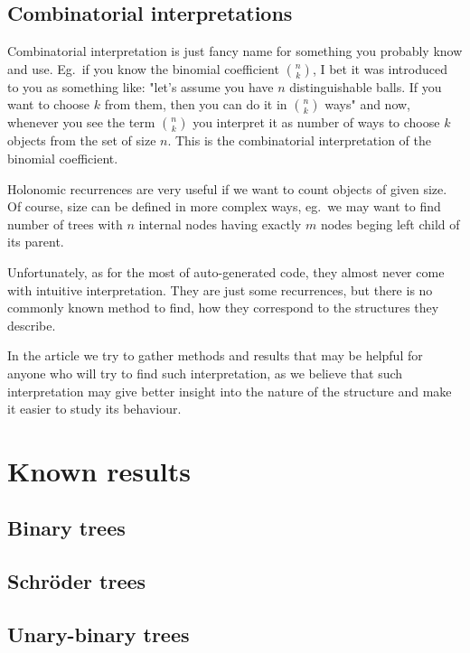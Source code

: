\documentclass[final]{article}
\theoremstyle{definition}
\theoremstyle{remark}
\begin{document}
\subsection{Combinatorial interpretations}

Combinatorial interpretation is just fancy name for something you probably know and use. Eg.\ if you know the binomial coefficient \(\binom{n}{k}\), I bet it was introduced to you as something like: "let's assume you have \(n\) distinguishable balls. If you want to choose \(k\) from them, then you can do it in \(\binom{n}{k}\) ways" and now, whenever you see the term \(\binom{n}{k}\) you interpret it as number of ways to choose \(k\) objects from the set of size \(n\). This is the combinatorial interpretation of the binomial coefficient.

Holonomic recurrences are very useful if we want to count objects of given size. Of course, size can be defined in more complex ways, eg.\ we may want to find number of trees with \(n\) internal nodes having exactly \(m\) nodes beging left child of its parent.

Unfortunately, as for the most of auto-generated code, they almost never come with intuitive interpretation. They are just some recurrences, but there is no commonly known method to find, how they correspond to the structures they describe.

In the article we try to gather methods and results that may be helpful for anyone who will try to find such interpretation, as we believe that such interpretation may give better insight into the nature of the structure and make it easier to study its behaviour.

\section{Known results}

\subsection{Binary trees}

\subsection{Schröder trees}

\subsection{Unary-binary trees}
\end{document}

